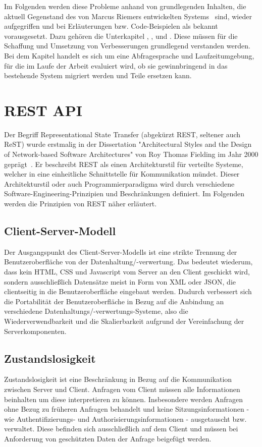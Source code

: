 Im Folgenden werden diese Probleme anhand von grundlegenden Inhalten, die aktuell Gegenstand des von Marcus Riemers entwickelten Systems~\cite{riemer2016} sind,
wieder aufgegriffen und bei Erläuterungen bzw. Code-Beispielen als bekannt vorausgesetzt.
Dazu gehören die Unterkapitel , ,  und .
Diese müssen für die Schaffung und Umsetzung von Verbesserungen grundlegend verstanden werden.
Bei dem Kapitel  handelt es sich um eine Abfragesprache und Laufzeitumgebung,
für die im Laufe der Arbeit evaluiert wird, ob sie gewinnbringend in das bestehende System migriert werden und Teile ersetzen kann.

\section{REST API}
\label{sec:basics:restapi}
Der Begriff Representational State Transfer (abgekürzt REST, seltener auch ReST) wurde erstmalig in der Dissertation "Architectural Styles and the Design of
Network-based Software Architectures" von Roy Thomas Fielding im Jahr 2000 geprägt~\cite{fielding-dissertation}.
Er beschreibt REST als einen Architekturstil für verteilte Systeme, welcher in eine einheitliche Schnittstelle für Kommunikation mündet.
Dieser Architekturstil oder auch Programmierparadigma wird durch verschiedene Software-Engineering-Prinzipien und Beschränkungen definiert.
Im Folgenden werden die Prinzipien von REST näher erläutert.

\subsection{Client-Server-Modell}
Der Ausgangspunkt des Client-Server-Modells ist eine strikte Trennung der Benutzeroberfläche von der Datenhaltung/-verwertung.
Das bedeutet wiederum, dass kein HTML, CSS und Javascript vom Server an den Client geschickt wird, sondern ausschließlich Datensätze
meist in Form von XML oder JSON, die clientseitig in die Benutzeroberfläche eingebaut werden.
Dadurch verbessert sich die Portabilität der Benutzeroberfläche in Bezug auf die Anbindung an verschiedene Datenhaltungs/-verwertungs-Systeme,
also die Wiederverwendbarkeit und die Skalierbarkeit aufgrund der Vereinfachung der Serverkomponenten.

\subsection{Zustandslosigkeit}
Zustandslosigkeit ist eine Beschränkung in Bezug auf die Kommunikation zwischen Server und Client.
Anfragen vom Client müssen alle Informationen beinhalten um diese interpretieren zu können.
Insbesondere werden Anfragen ohne Bezug zu früheren Anfragen behandelt und keine Sitzungsinformationen -
wie Authentifizierungs- und Authorisierungsinformationen - ausgetauscht bzw. verwaltet.
Diese befinden sich ausschließlich auf dem Client und müssen bei Anforderung von geschützten Daten der Anfrage beigefügt werden.


